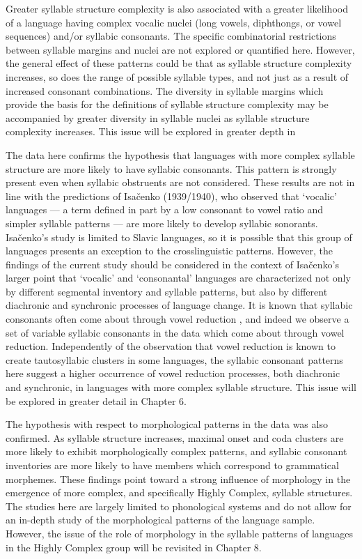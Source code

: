   Greater syllable structure complexity is also associated with a greater likelihood of a language having complex vocalic nuclei (long vowels, diphthongs, or vowel sequences) and/or syllabic consonants. The specific combinatorial restrictions between syllable margins and nuclei are not explored or quantified here. However, the general effect of these patterns could be that as syllable structure complexity increases, so does the range of possible syllable types, and not just as a result of increased consonant combinations. The diversity in syllable margins which provide the basis for the definitions of syllable structure complexity may be accompanied by greater diversity in syllable nuclei as syllable structure complexity increases. This issue will be explored in greater depth in 

  The data here confirms the hypothesis that languages with more complex syllable structure are more likely to have syllabic consonants. This pattern is strongly present even when syllabic obstruents are not considered. These results are not in line with the predictions of Isačenko (1939/1940), who observed that ‘vocalic’ languages — a term defined in part by a low consonant to vowel ratio and simpler syllable patterns — are more likely to develop syllabic sonorants. Isačenko’s study is limited to Slavic languages, so it is possible that this group of languages presents an exception to the crosslinguistic patterns. However, the findings of the current study should be considered in the context of Isačenko’s larger point that ‘vocalic’ and ‘consonantal’ languages are characterized not only by different segmental inventory and syllable patterns, but also by different diachronic and synchronic processes of language change. It is known that syllabic consonants often come about through vowel reduction \citep{Bell1978a}, and indeed we observe a set of variable syllabic consonants in the data which come about through vowel reduction. Independently of the observation that vowel reduction is known to create tautosyllabic clusters in some languages, the syllabic consonant patterns here suggest a higher occurrence of vowel reduction processes, both diachronic and synchronic, in languages with more complex syllable structure. This issue will be explored in greater detail in Chapter 6.

  The hypothesis with respect to morphological patterns in the data was also confirmed. As syllable structure increases, maximal onset and coda clusters are more likely to exhibit morphologically complex patterns, and syllabic consonant inventories are more likely to have members which correspond to grammatical morphemes. These findings point toward a strong influence of morphology in the emergence of more complex, and specifically Highly Complex, syllable structures. The studies here are largely limited to phonological systems and do not allow for an in-depth study of the morphological patterns of the language sample. However, the issue of the role of morphology in the syllable patterns of languages in the Highly Complex group will be revisited in Chapter 8.

